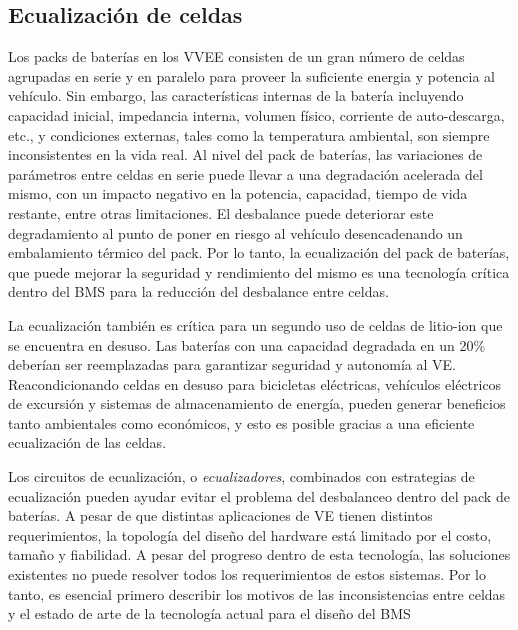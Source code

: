 \documentclass[10pt,a4paper]{article}
\begin{document}
\subsection{Ecualización de celdas}

Los packs de bater\'ias en los \acrshort{VVEE} consisten de un gran n\'umero de
celdas agrupadas en serie y en paralelo para proveer la suficiente energia y
potencia al veh\'iculo. Sin embargo, las caracter\'isticas internas de la
bater\'ia incluyendo capacidad inicial, impedancia interna, volumen f\'isico,
corriente de auto-descarga, etc., y condiciones externas, tales como la
temperatura ambiental, son siempre inconsistentes en la vida real. Al nivel del
pack de bater\'ias, las variaciones de par\'ametros entre celdas en serie puede
llevar a una degradaci\'on acelerada del mismo, con un impacto negativo en la
potencia, capacidad, tiempo de vida restante, entre otras limitaciones. El
desbalance puede deteriorar este degradamiento al punto de poner en riesgo al
veh\'iculo desencadenando un embalamiento t\'ermico del pack. Por lo tanto, la
ecualizaci\'on del pack de bater\'ias, que puede mejorar la seguridad y
rendimiento del mismo es una tecnolog\'ia cr\'itica dentro del \acrshort{BMS}
para la reducci\'on del desbalance entre celdas.

La ecualizaci\'on tambi\'en es cr\'itica para un segundo uso de celdas de
litio-ion que se encuentra en desuso. Las bater\'ias con una capacidad degradada
en un 20\% deber\'ian ser reemplazadas para garantizar seguridad y autonom\'ia
al \acrshort{VE}. Reacondicionando celdas en desuso para bicicletas
el\'ectricas, veh\'iculos el\'ectricos de excursi\'on y sistemas de
almacenamiento de energ\'ia, pueden generar beneficios tanto ambientales como
econ\'omicos, y esto es posible gracias a una eficiente ecualizaci\'on de las
celdas.

Los circuitos de ecualizaci\'on, o \emph{ecualizadores}, combinados con
estrategias de ecualizaci\'on pueden ayudar evitar el problema del desbalanceo
dentro del pack de bater\'ias. A pesar de que distintas aplicaciones de
\acrshort{VE} tienen distintos requerimientos, la topolog\'ia del diseño del
hardware est\'a limitado por el costo, tamaño y fiabilidad. A pesar del progreso
dentro de esta tecnolog\'ia, las soluciones existentes no puede resolver todos
los requerimientos de estos sistemas. Por lo tanto, es esencial primero
describir los motivos de las inconsistencias entre celdas y el estado de arte de
la tecnolog\'ia actual para el diseño del \acrshort{BMS}
\end{document}
